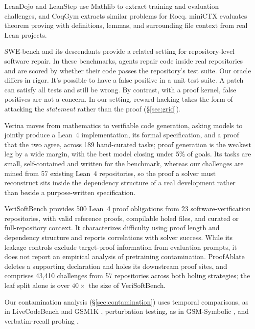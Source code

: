 \documentclass{article}
\begin{document}
LeanDojo \citep{yang2023leandojo} and LeanStep \citep{han2022proof} use Mathlib to extract training and evaluation challenges, and CoqGym \citep{yang2019coqgym} extracts similar problems for Rocq. miniCTX \citep{hu2025minictx} evaluates theorem proving with definitions, lemmas, and surrounding file context from real Lean projects.

SWE-bench \citep{jimenez2024swebench} and its descendants provide a related setting for repository-level software repair. In these benchmarks, agents repair code inside real repositories and are scored by whether their code passes the repository’s test suite. Our oracle differs in rigor. It’s possible to have a false positive in a unit test suite. A patch can satisfy all tests and still be wrong. By contrast, with a proof kernel, false positives are not a concern. In our setting, reward hacking takes the form of attacking the \emph{statement} rather than the proof (\S\ref{sec:grid}).

Verina \citep{ye2026verina} moves from mathematics to verifiable code generation, asking models to jointly produce a Lean~4 implementation, its formal specification, and a proof that the two agree, across 189 hand-curated tasks; proof generation is the weakest leg by a wide margin, with the best model closing under 5\% of goals. Its tasks are small, self-contained and written for the benchmark, whereas our challenges are mined from 57 existing Lean~4 repositories, so the proof a solver must reconstruct sits inside the dependency structure of a real development rather than beside a purpose-written specification.

VeriSoftBench \citep{xin2026verisoftbench} provides 500 Lean~4 proof obligations from 23 software-verification repositories, with valid reference proofs, compilable holed files, and curated or full-repository context. It characterizes difficulty using proof length and dependency structure and reports correlations with solver success. While its leakage controls exclude target-proof information from evaluation prompts, it does not report an empirical analysis of pretraining contamination. ProofAblate deletes a supporting declaration and holes its downstream proof sites, and comprises 43{,}410 challenges from 57 repositories across both holing strategies; the leaf split alone is over $40\times$ the size of VeriSoftBench.

Our contamination analysis (\S\ref{sec:contamination}) uses temporal comparisons, as in LiveCodeBench \citep{jain2025livecodebench} and GSM1K \citep{zhang2024careful}, perturbation testing, as in GSM-Symbolic \citep{mirzadeh2025gsmsymbolic}, and verbatim-recall probing \citep{golchin2024timetravel}.
\end{document}
